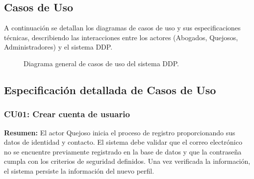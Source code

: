 
\begin{appendices}

\chapter{Casos de Uso}
\label{anexo:casos_uso}

A continuación se detallan los diagramas de casos de uso y sus especificaciones técnicas, describiendo las interacciones entre los actores (Abogados, Quejosos, Administradores) y el sistema DDP.

\begin{figure}[htbp]
    \centering
    \caption{Diagrama general de casos de uso del sistema DDP.}
    \label{fig:casos_uso_general}
\end{figure}
\begin{flushleft}
\section{Especificación detallada de Casos de Uso}
\end{flushleft}
\justifying

\subsection{CU01: Crear cuenta de usuario}

\textbf{Resumen:} 
El actor Quejoso inicia el proceso de registro proporcionando sus datos de identidad y contacto. El sistema debe validar que el correo electrónico no se encuentre previamente registrado en la base de datos y que la contraseña cumpla con los criterios de seguridad definidos. Una vez verificada la información, el sistema persiste la información del nuevo perfil.


\end{appendices}
